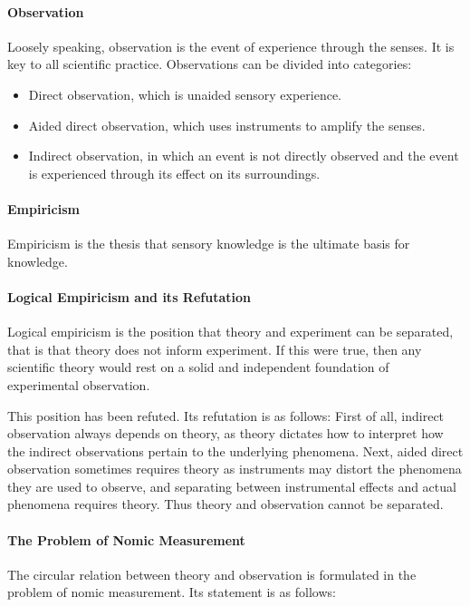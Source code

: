 \paragraph{Observation}
Loosely speaking, observation is the event of experience through the senses. It is key to all scientific practice. Observations can be divided into categories:
\begin{itemize}
	\item Direct observation, which is unaided sensory experience.
	\item Aided direct observation, which uses instruments to amplify the senses.
	\item Indirect observation, in which an event is not directly observed and the event is experienced through its effect on its surroundings.
\end{itemize}

\paragraph{Empiricism}
Empiricism is the thesis that sensory knowledge is the ultimate basis for knowledge.

\paragraph{Logical Empiricism and its Refutation}
Logical empiricism is the position that theory and experiment can be separated, that is that theory does not inform experiment. If this were true, then any scientific theory would rest on a solid and independent foundation of experimental observation.

This position has been refuted. Its refutation is as follows: First of all, indirect observation always depends on theory, as theory dictates how to interpret how the indirect observations pertain to the underlying phenomena. Next, aided direct observation sometimes requires theory as instruments may distort the phenomena they are used to observe, and separating between instrumental effects and actual phenomena requires theory. Thus theory and observation cannot be separated.

\paragraph{The Problem of Nomic Measurement}
The circular relation between theory and observation is formulated in the problem of nomic measurement. Its statement is as follows:

